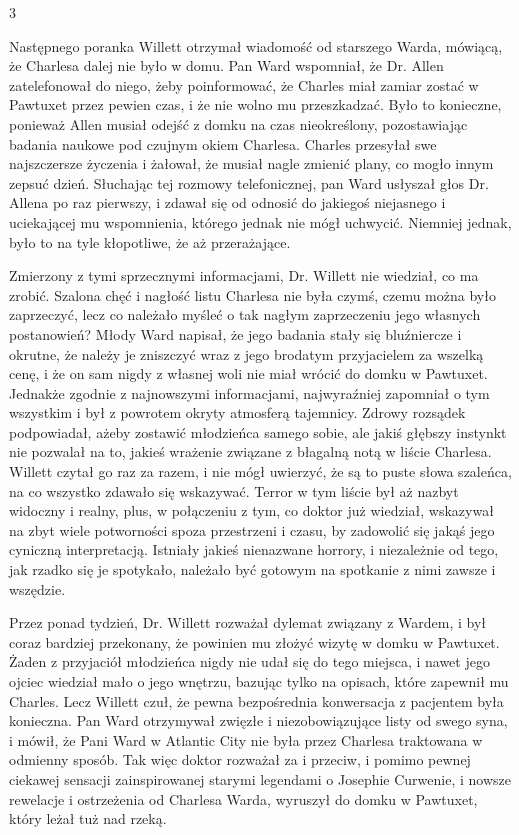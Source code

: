 \begin{center}
3
\end{center}

Następnego poranka Willett otrzymał wiadomość od starszego Warda, mówiącą, że Charlesa dalej nie było w domu. Pan Ward wspomniał, że Dr. Allen zatelefonował do niego, żeby poinformować, że Charles miał zamiar zostać w Pawtuxet przez pewien czas, i że nie wolno mu przeszkadzać. Było to konieczne, ponieważ Allen musiał odejść z domku na czas nieokreślony, pozostawiając badania naukowe pod czujnym okiem Charlesa. Charles przesyłał swe najszczersze życzenia i żałował, że musiał nagle zmienić plany, co mogło innym zepsuć dzień. Słuchając tej rozmowy telefonicznej, pan Ward usłyszał głos Dr. Allena po raz pierwszy, i zdawał się od odnosić do jakiegoś niejasnego i uciekającej mu wspomnienia, którego jednak nie mógł uchwycić. Niemniej jednak, było to na tyle kłopotliwe, że aż przerażające. 

Zmierzony z tymi sprzecznymi informacjami, Dr. Willett nie wiedział, co ma zrobić. Szalona chęć i nagłość listu Charlesa nie była czymś, czemu można było zaprzeczyć, lecz co należało myśleć o tak nagłym zaprzeczeniu jego własnych postanowień? Młody Ward napisał, że jego badania stały się bluźniercze i okrutne, że należy je zniszczyć wraz z jego brodatym przyjacielem za wszelką cenę, i że on sam nigdy z własnej woli nie miał wrócić do domku w Pawtuxet. Jednakże zgodnie z najnowszymi informacjami, najwyraźniej zapomniał o tym wszystkim i był z powrotem okryty atmosferą tajemnicy. Zdrowy rozsądek podpowiadał, ażeby zostawić młodzieńca samego sobie, ale jakiś głębszy instynkt nie pozwalał na to, jakieś wrażenie związane z błagalną notą w liście Charlesa. Willett czytał go raz za razem, i nie mógł uwierzyć, że są to puste słowa szaleńca, na co wszystko zdawało się wskazywać. Terror w tym liście był aż nazbyt widoczny i realny, plus, w połączeniu z tym, co doktor już wiedział, wskazywał na zbyt wiele potworności spoza przestrzeni i czasu, by zadowolić się jakąś jego cyniczną interpretacją. Istniały jakieś nienazwane horrory, i niezależnie od tego, jak rzadko się je spotykało, należało być gotowym na spotkanie z nimi zawsze i wszędzie. 

Przez ponad tydzień, Dr. Willett rozważał dylemat związany z Wardem, i był coraz bardziej przekonany, że powinien mu złożyć wizytę w domku w Pawtuxet. Żaden z przyjaciół młodzieńca nigdy nie udał się do tego miejsca, i nawet jego ojciec wiedział mało o jego wnętrzu, bazując tylko na opisach, które zapewnił mu Charles. Lecz Willett czuł, że pewna bezpośrednia konwersacja z pacjentem była konieczna. Pan Ward otrzymywał zwięzłe i niezobowiązujące listy od swego syna, i mówił, że Pani Ward w Atlantic City nie była przez Charlesa traktowana w odmienny sposób. Tak więc doktor rozważał za i przeciw, i pomimo pewnej ciekawej sensacji zainspirowanej starymi legendami o Josephie Curwenie, i nowsze rewelacje i ostrzeżenia od Charlesa Warda, wyruszył do domku w Pawtuxet, który leżał tuż nad rzeką. 

